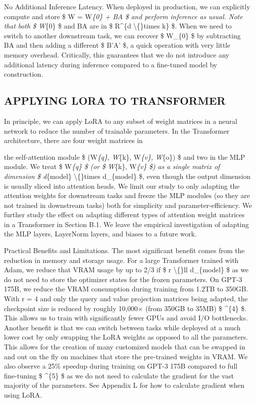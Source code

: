 \documentclass[conference]{IEEEtran}
\begin{document}
No Additional Inference Latency. When deployed in production, we can explicitly compute and store  \$ W = W\textit{\{0\} + BA \$ and perform inference as usual. Note that both  \$ W}\{0\} \$ and BA are in  \$ R\textasciicircum{}\{d \textbackslash\{\}times k\} \$. When we need to switch to another downstream task, we can recover  \$ W\_\{0\} \$ by subtracting BA and then adding a different  \$ B'A' \$, a quick operation with very little memory overhead. Critically, this guarantees that we do not introduce any additional latency during inference compared to a fine-tuned model by construction.




\subsection{APPLYING LORA TO TRANSFORMER}

In principle, we can apply LoRA to any subset of weight matrices in a neural network to reduce the number of trainable parameters. In the Transformer architecture, there are four weight matrices in

the self-attention module  \$ (W\textit{\{q\}, W}\{k\}, W\textit{\{v\}, W}\{o\}) \$ and two in the MLP module. We treat  \$ W\textit{\{q\} \$ (or  \$ W}\{k\}, W\textit{\{v\} \$) as a single matrix of dimension  \$ d}\{model\} \textbackslash\{\}times d\_\{model\} \$, even though the output dimension is usually sliced into attention heads. We limit our study to only adapting the attention weights for downstream tasks and freeze the MLP modules (so they are not trained in downstream tasks) both for simplicity and parameter-efficiency. We further study the effect on adapting different types of attention weight matrices in a Transformer in Section B.1. We leave the empirical investigation of adapting the MLP layers, LayerNorm layers, and biases to a future work.

Practical Benefits and Limitations. The most significant benefit comes from the reduction in memory and storage usage. For a large Transformer trained with Adam, we reduce that VRAM usage by up to 2/3 if  \$ r \textbackslash\{\}ll d\_\{model\} \$ as we do not need to store the optimizer states for the frozen parameters. On GPT-3 175B, we reduce the VRAM consumption during training from 1.2TB to 350GB. With r = 4 and only the query and value projection matrices being adapted, the checkpoint size is reduced by roughly 10,000× (from 350GB to 35MB) \$ \textasciicircum{}\{4\} \$. This allows us to train with significantly fewer GPUs and avoid I/O bottlenecks. Another benefit is that we can switch between tasks while deployed at a much lower cost by only swapping the LoRA weights as opposed to all the parameters. This allows for the creation of many customized models that can be swapped in and out on the fly on machines that store the pre-trained weights in VRAM. We also observe a 25\% speedup during training on GPT-3 175B compared to full fine-tuning \$ \textasciicircum{}\{5\} \$ as we do not need to calculate the gradient for the vast majority of the parameters. See Appendix L for how to calculate gradient when using LoRA.
\end{document}
